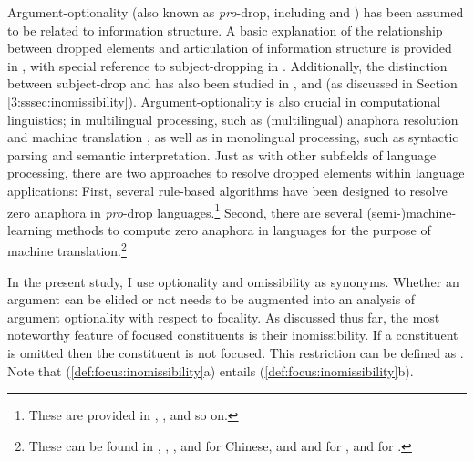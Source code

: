Argument-optionality (also known as \textit{pro}-drop, including
 and ) has been assumed to be
related to information structure. A basic
explanation of the relationship between dropped elements and
articulation of information structure is provided in
\citet{alonso:etal:02}, with special reference to subject-dropping in
. Additionally, the distinction between subject-drop and
 has also been studied in \citet{li:thompson:76},
\citet{huang:84} and \citet{yang:02} (as discussed in
Section \ref{3:sssec:inomissibility}).  Argument-optionality is also crucial
in computational linguistics; in multilingual processing, such as
(multilingual) anaphora resolution and machine translation
\citep{mitkov:etal:95,mitkov:99}, as well as in monolingual
processing, such as syntactic parsing and semantic
interpretation. Just as with other subfields of language processing,
there are two approaches to resolve dropped elements within language
applications: First, several rule-based algorithms have been designed
to resolve zero anaphora in \textit{pro}-drop
languages.\footnote{These are provided in \citet{han:06},
  \citet{byron:etal:06}, and so on.} Second, there are several
(semi-)machine-learning methods to compute zero anaphora in
 languages for the purpose of machine
translation.\footnote{These can be found in \citet{zhao:ng:07},
  \citet{yeh:chen:04}, \citet{kong:ng:13}, and \citet{chen:ng:13} for
  Chinese, \citet{nakaiwa:shirai:96} and \citet{matsui:99} and
  \citet{hangyo:etal:13} for , and \citet{roh:lee:03}
  for .}




In the present study, I use optionality and omissibility as
synonyms. Whether an argument can be elided or not needs to be
augmented into an analysis of argument optionality with respect to
focality. As discussed thus far, the most
noteworthy feature of focused constituents is their inomissibility. If
a constituent is omitted then the constituent is not focused. This
restriction can be defined as .  Note
that (\ref{def:focus:inomissibility}a) entails
(\ref{def:focus:inomissibility}b).




